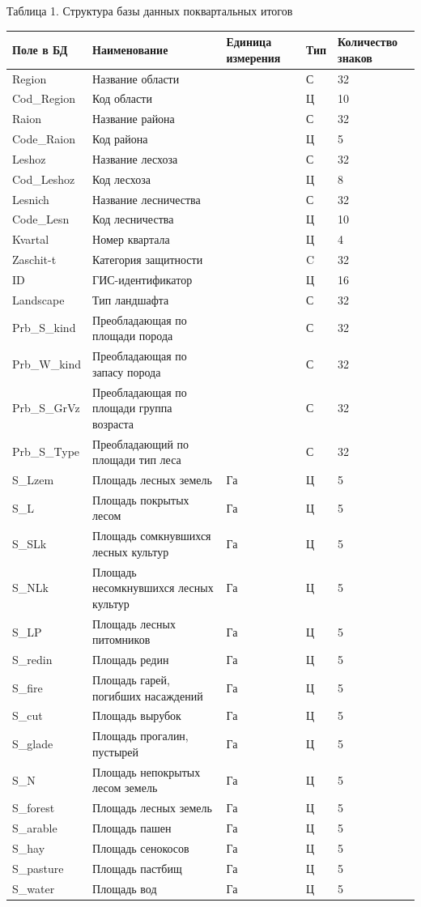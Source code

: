\documentclass{article}
\begin{document}
\begin{flushright}
Таблица 1. Структура базы данных поквартальных 
итогов 

\begin{tabular}{|>{\raggedright}p{71pt}|>{\raggedright}p{200pt}|>{\raggedright}p{58pt}|>{\raggedright}p{22pt}|>{\raggedright}p{51pt}|}
\hline
П\textbf{оле в БД} & Н\textbf{аименование} & Е\textbf{диница 
измерения} & Т\textbf{ип} & К\textbf{оличество}\linebreak{}
\textbf{знаков}\tabularnewline
\hline
Region & Название области &  & С & 32\tabularnewline
\hline
Cod\_Region & Код области &  & Ц & 10\tabularnewline
\hline
Raion & Название района &  & С & 32\tabularnewline
\hline
Code\_Raion & Код района &  & Ц & 5\tabularnewline
\hline
Leshoz & Название лесхоза &  & С & 32\tabularnewline
\hline
Cod\_Leshoz & Код лесхоза &  & Ц & 8\tabularnewline
\hline
Lesnich & Название лесничества &  & С & 32\tabularnewline
\hline
Code\_Lesn & Код лесничества &  & Ц & 10\tabularnewline
\hline
Kvartal & Номер квартала &  & Ц & 4\tabularnewline
\hline
Zaschit-t & Категория защитности &  & C & 32\tabularnewline
\hline
ID & ГИС-идентификатор &  & Ц & 16\tabularnewline
\hline
Landscape & Тип ландшафта &  & С & 32\tabularnewline
\hline
Prb\_S\_kind & Преобладающая по площади порода &  & С & 32\tabularnewline
\hline
Prb\_W\_kind & Преобладающая по запасу порода &  & С & 32\tabularnewline
\hline
Prb\_S\_GrVz & Преобладающая по площади группа возраста &  & С & 32\tabularnewline
\hline
Prb\_S\_Type & Преобладающий по площади тип леса &  & С & 32\tabularnewline
\hline
S\_Lzem & Площадь лесных земель & Га & Ц & 5\tabularnewline
\hline
S\_L & Площадь покрытых лесом & Га & Ц & 5\tabularnewline
\hline
S\_SLk & Площадь сомкнувшихся лесных культур & Га & Ц & 5\tabularnewline
\hline
S\_NLk & Площадь несомкнувшихся лесных культур & Га & Ц & 5\tabularnewline
\hline
S\_LP & Площадь лесных питомников & Га & Ц & 5\tabularnewline
\hline
S\_redin & Площадь редин & Га & Ц & 5\tabularnewline
\hline
S\_fire & Площадь гарей, погибших насаждений & Га & Ц & 5\tabularnewline
\hline
S\_cut & Площадь вырубок & Га & Ц & 5\tabularnewline
\hline
S\_glade & Площадь прогалин, пустырей & Га & Ц & 5\tabularnewline
\hline
S\_N & Площадь непокрытых лесом земель & Га & Ц & 5\tabularnewline
\hline
S\_forest & Площадь лесных земель & Га & Ц & 5\tabularnewline
\hline
S\_arable & Площадь пашен & Га & Ц & 5\tabularnewline
\hline
S\_hay & Площадь сенокосов & Га & Ц & 5\tabularnewline
\hline
S\_pasture & Площадь пастбищ & Га & Ц & 5\tabularnewline
\hline
S\_water & Площадь вод & Га & Ц & 5\tabularnewline

\end{tabular}
\end{flushright}
\end{document}
